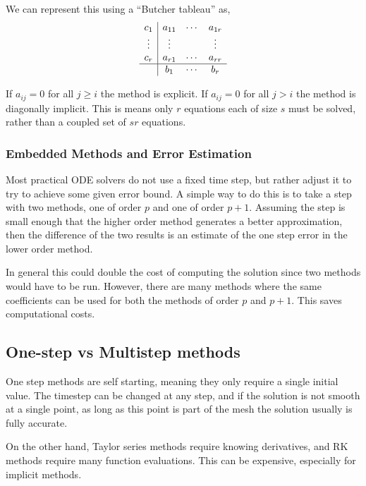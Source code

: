 \documentclass[12pt]{article}
\begin{document}
We can represent this using a ``Butcher tableau'' as,
\begin{align*}
    \begin{array}{c|ccc}
        c_1 & a_{11} & \cdots & a_{1r} \\
        \vdots & \vdots && \vdots \\
        c_r & a_{r1} & \cdots & a_{rr} \\ \hline
        & b_1 & \cdots & b_r
    \end{array}
\end{align*}

If \( a_{ij} = 0 \) for all \( j\geq i \) the method is explicit. If \( a_{ij} = 0 \) for all \( j > i \) the method is diagonally implicit. This is means only \( r \) equations each of size \( s \) must be solved, rather than a coupled set of \( sr \) equations.

\subsubsection{Embedded Methods and Error Estimation}
Most practical ODE solvers do not use a fixed time step, but rather adjust it to try to achieve some given error bound. A simple way to do this is to take a step with two methods, one of order \( p \) and one of order \( p+1 \). Assuming the step is small enough that the higher order method generates a better approximation, then the difference of the two results is an estimate of the one step error in the lower order method.

In general this could double the cost of computing the solution since two methods would have to be run. However, there are many methods where the same coefficients can be used for both the methods of order \( p \) and \( p+1 \). This saves computational costs.

\subsection{One-step vs Multistep methods}
One step methods are self starting, meaning they only require a single initial value. The timestep can be changed at any step, and if the solution is not smooth at a single point, as long as this point is part of the mesh the solution usually is fully accurate.

On the other hand, Taylor series methods require knowing derivatives, and RK methods require many function evaluations. This can be expensive, especially for implicit methods.
\end{document}
